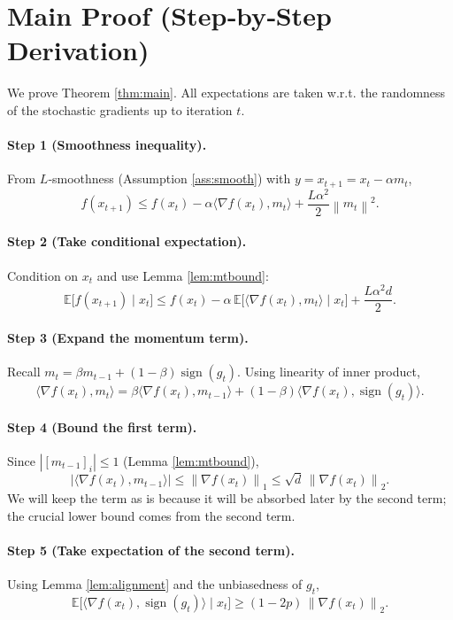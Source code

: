 \documentclass[11pt]{article}
\newcommand{\EE}{\mathbb{E}}
\newcommand{\norm}[1]{\left\lVert#1\right\rVert}
\newcommand{\sign}{\operatorname{sign}}
\begin{document}
\section*{Main Proof (Step‑by‑Step Derivation)}
We prove Theorem \ref{thm:main}.  All expectations are taken w.r.t. the randomness of the stochastic gradients up to iteration $t$.

\paragraph{Step 1 (Smoothness inequality).}
From $L$‑smoothness (Assumption \ref{ass:smooth}) with $y=x_{t+1}=x_{t}-\alpha m_{t}$,
\[
f(x_{t+1})\le f(x_{t})-\alpha\langle\nabla f(x_{t}),m_{t}\rangle
          +\frac{L\alpha^{2}}{2}\norm{m_{t}}^{2}.
\tag{3}
\]

\paragraph{Step 2 (Take conditional expectation).}
Condition on $x_{t}$ and use Lemma \ref{lem:mtbound}:
\[
\EE\big[f(x_{t+1})\mid x_{t}\big]
\le f(x_{t})-\alpha\,\EE\big[\langle\nabla f(x_{t}),m_{t}\rangle\mid x_{t}\big]
      +\frac{L\alpha^{2}d}{2}.
\tag{4}
\]

\paragraph{Step 3 (Expand the momentum term).}
Recall $m_{t}= \beta m_{t-1}+(1-\beta)\sign(g_{t})$.
Using linearity of inner product,
\[
\langle\nabla f(x_{t}),m_{t}\rangle
= \beta\langle\nabla f(x_{t}),m_{t-1}\rangle
  +(1-\beta)\langle\nabla f(x_{t}),\sign(g_{t})\rangle .
\tag{5}
\]

\paragraph{Step 4 (Bound the first term).}
Since $|[m_{t-1}]_{i}|\le1$ (Lemma \ref{lem:mtbound}),
\[
|\langle\nabla f(x_{t}),m_{t-1}\rangle|
\le \norm{\nabla f(x_{t})}_{1}
\le \sqrt{d}\,\norm{\nabla f(x_{t})}_{2}.
\tag{6}
\]
We will keep the term as is because it will be absorbed later by the
second term; the crucial lower bound comes from the second term.

\paragraph{Step 5 (Take expectation of the second term).}
Using Lemma \ref{lem:alignment} and the unbiasedness of $g_{t}$,
\[
\EE\big[\langle\nabla f(x_{t}),\sign(g_{t})\rangle\mid x_{t}\big]
\ge (1-2p)\,\norm{\nabla f(x_{t})}_{2}.
\tag{7}
\]
\end{document}

